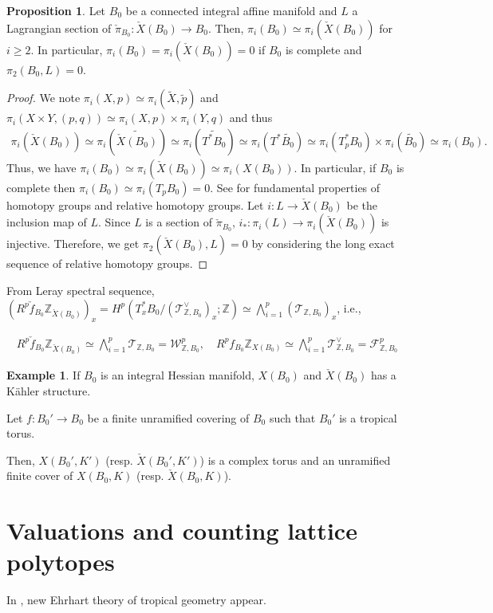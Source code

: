 \documentclass[a4paper,dvipdfmx,reqno,12pt]{amsart}
\theoremstyle{definition}
\newtheorem{example}[theorem]{Example}
\newtheorem{proposition}[theorem]{Proposition}
\newcommand{\Z}{\mathbb{Z}}%
\newcommand{\mcal}[1]{\mathcal{#1}}%
\newcommand{\TBZ}{\mcal{T}_{\Z,B_0}}
\numberwithin{equation}{section}
\begin{document}
\begin{proposition}
\label{proposition-unobstructed-lagrangian}
Let $B_0$ be a connected integral affine manifold 
and $L$ a Lagrangian section of 
$\check{\pi}_{B_0}\colon \check{X}(B_0)\to B_0$. 
Then, $\pi_i(B_0)\simeq \pi_i(\check{X}(B_0))$ 
for $i\geq 2$.
In particular, 
$\pi_i(B_0)=\pi_i(\check{X}(B_0))=0$ if 
$B_0$ is complete and $\pi_2(B_0,L)=0$.
\end{proposition}
\begin{proof}
We note $\pi_{i}(X,p)\simeq \pi_{i}(\widetilde{X},\tilde{p})$ and $\pi_{i}(X\times Y,(p,q))\simeq \pi_i(X,p)\times \pi_i(Y,q)$ and thus
\begin{align}
\pi_{i}(\check{X}(B_0))\simeq 
\pi_{i}(\widetilde{\check{X}(B_0)})\simeq 
\pi_{i}(\widetilde{T^{*}B_0})\simeq 
\pi_{i}(T^{*}\widetilde{B_0})\simeq 
\pi_{i}(T_p^* B_0)\times \pi_{i}(\widetilde{B_0})\simeq 
\pi_{i}(B_0).
\end{align}
Thus, we have $\pi_{i}(B_0)\simeq \pi_{i}(\check{X}(B_0))\simeq \pi_{i}(X(B_0))$. In particular, if $B_0$ is complete then $\pi_{i}(B_0)\simeq \pi_{i}(T_{p}B_0)=0$. See \cite[Chapter 4]{hatcherAlgebraicTopology2002a} for fundamental properties of homotopy groups and relative homotopy groups.
Let $i\colon L\to \check{X}(B_0)$ be the inclusion map of 
$L$.
Since $L$ is a section of 
$\check{\pi}_{B_0}$, 
$i_*\colon \pi_i(L)\to \pi_i(\check{X}(B_0))$ is 
injective. Therefore, we get 
$\pi_2(\check{X}(B_0),L)=0$ by considering the long exact
sequence of relative homotopy groups.
\end{proof}
From Leray spectral sequence, $(R^{p}\check{f}_{B_0}\Z_{\check{X}(B_0)})_{x}=H^{p}(T^{*}_xB_0/(\TBZ^{\vee})_x;\Z)\simeq \bigwedge_{i=1}^{p}(\TBZ)_{x}$, i.e.,

\begin{align}
  R^{p}\check{f}_{B_0}\Z_{\check{X}(B_0)}\simeq \bigwedge_{i=1}^{p} \TBZ=\mcal{W}^{p}_{\Z,B_0}, \quad R^{p}f_{B_0}\Z_{X(B_0)}\simeq \bigwedge_{i=1}^{p} \TBZ^{\vee}=\mcal{F}_{\Z,B_0}^{p}
\end{align}



\begin{example}
If $B_0$ is an integral Hessian manifold, 
$X(B_0)$ and $\check{X}(B_0)$ has a K\"ahler structure.

Let $f:B_0' \to B_0$ be a finite unramified covering of $B_0$ such that $B_0'$ is a tropical torus.

Then, $X(B_0',K')$ (resp. $\check{X}(B_0',K')$) 
is a complex torus and an unramified finite cover 
of $X(B_0,K)$ (resp. $\check{X}(B_0,K)$).

\end{example}

\section{Valuations and counting lattice polytopes}

In \cite{MR4155409},
new Ehrhart theory of tropical geometry appear.




\printindex
\end{document}
